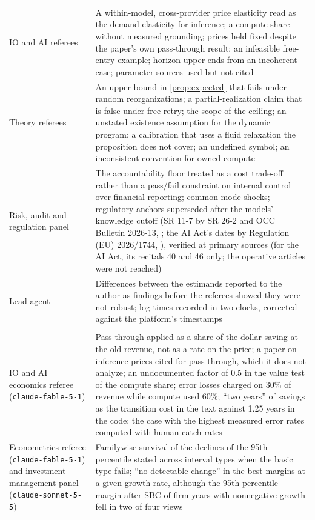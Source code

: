 {\begin{longtable}{@{}p{}p{}@{}}
IO and AI referees & A within-model, cross-provider price elasticity read as the demand elasticity for inference; a compute share without measured grounding; prices held fixed despite the paper's own pass-through result; an infeasible free-entry example; horizon upper ends from an incoherent case; parameter sources used but not cited\\
Theory referees & An upper bound in \autoref{prop:expected} that fails under random reorganizations; a partial-realization claim that is false under free retry; the scope of the ceiling; an unstated existence assumption for the dynamic program; a calibration that uses a fluid relaxation the proposition does not cover; an undefined symbol; an inconsistent convention for owned compute\\
Risk, audit and regulation panel & The accountability floor treated as a cost trade-off rather than a pass/fail constraint on internal control over financial reporting; common-mode shocks; regulatory anchors superseded after the models' knowledge cutoff (SR 11-7 by SR 26-2 and OCC Bulletin 2026-13, \citealp{fed2026sr262,occ2026bulletin13}; the AI Act's dates by Regulation (EU) 2026/1744, \citealp{eu2026reg1744}), verified at primary sources (for the AI Act, its recitals 40 and 46 only; the operative articles were not reached)\\
Lead agent & Differences between the estimands reported to the author as findings before the referees showed they were not robust; log times recorded in two clocks, corrected against the platform's timestamps\\
\addlinespace\multicolumn{2}{@{}l}{\emph{Review of the second version}}\\
IO and AI economics referee (\texttt{claude-fable-5-1}) & Pass-through applied as a share of the dollar saving at the old revenue, not as a rate on the price; a paper on inference prices cited for pass-through, which it does not analyze; an undocumented factor of 0.5 in the value test of the compute share; error losses charged on 30\% of revenue while compute used 60\%; ``two years'' of savings as the transition cost in the text against 1.25 years in the code; the case with the highest measured error rates computed with human catch rates\\
Econometrics referee (\texttt{claude-fable-5-1}) and investment management panel (\texttt{claude-sonnet-5-5}) & Familywise survival of the declines of the 95th percentile stated across interval types when the basic type fails; ``no detectable change'' in the best margins at a given growth rate, although the 95th-percentile margin after SBC of firm-years with nonnegative growth fell in two of four views\\

\end{longtable}}
